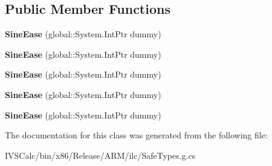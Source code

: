 \subsection*{Public Member Functions}
\begin{DoxyCompactItemize}
\item 
\mbox{\label{class_windows_1_1_u_i_1_1_xaml_1_1_media_1_1_animation_1_1_sine_ease_ae3b4f6bc64e49d55f29f37d60e436aee}} 
{\bfseries Sine\+Ease} (global\+::\+System.\+Int\+Ptr dummy)
\item 
\mbox{\label{class_windows_1_1_u_i_1_1_xaml_1_1_media_1_1_animation_1_1_sine_ease_ae3b4f6bc64e49d55f29f37d60e436aee}} 
{\bfseries Sine\+Ease} (global\+::\+System.\+Int\+Ptr dummy)
\item 
\mbox{\label{class_windows_1_1_u_i_1_1_xaml_1_1_media_1_1_animation_1_1_sine_ease_ae3b4f6bc64e49d55f29f37d60e436aee}} 
{\bfseries Sine\+Ease} (global\+::\+System.\+Int\+Ptr dummy)
\item 
\mbox{\label{class_windows_1_1_u_i_1_1_xaml_1_1_media_1_1_animation_1_1_sine_ease_ae3b4f6bc64e49d55f29f37d60e436aee}} 
{\bfseries Sine\+Ease} (global\+::\+System.\+Int\+Ptr dummy)
\item 
\mbox{\label{class_windows_1_1_u_i_1_1_xaml_1_1_media_1_1_animation_1_1_sine_ease_ae3b4f6bc64e49d55f29f37d60e436aee}} 
{\bfseries Sine\+Ease} (global\+::\+System.\+Int\+Ptr dummy)
\end{DoxyCompactItemize}


The documentation for this class was generated from the following file\+:\begin{DoxyCompactItemize}
\item 
I\+V\+S\+Calc/bin/x86/\+Release/\+A\+R\+M/ilc/Safe\+Types.\+g.\+cs\end{DoxyCompactItemize}
